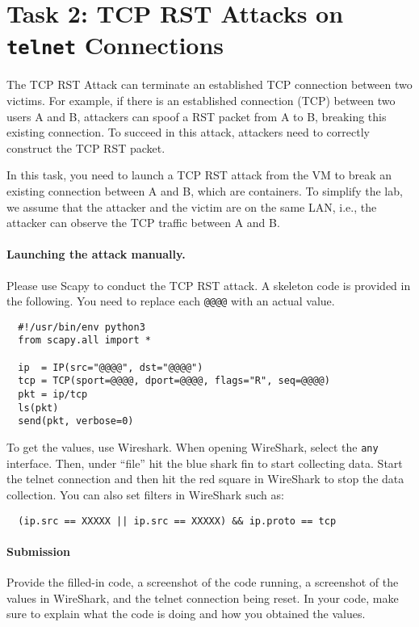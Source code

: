 \section {Task 2: TCP RST Attacks on \texttt{telnet} Connections}

The TCP RST Attack can terminate an established TCP connection between
two victims. For example, if there is an established \telnet connection (TCP)
between two users A and B, attackers can spoof a RST packet from A to B,
breaking this existing connection. To succeed in this attack, attackers
need to correctly construct the TCP RST packet. 

In this task, you need to launch a TCP RST attack from the VM 
to break an existing \telnet connection between A and B, which are 
containers.  To simplify the lab,
we assume that the attacker and the victim are on the same LAN,
i.e., the attacker can observe the TCP traffic between
A and B.


\paragraph{Launching the attack manually.} 
Please use Scapy to conduct the TCP RST attack. 
A skeleton code is provided in the following. You need to replace each
\texttt{@@@@} with an actual value.

\begin{lstlisting}
  #!/usr/bin/env python3
  from scapy.all import *
  
  ip  = IP(src="@@@@", dst="@@@@")
  tcp = TCP(sport=@@@@, dport=@@@@, flags="R", seq=@@@@)
  pkt = ip/tcp
  ls(pkt)
  send(pkt, verbose=0)
\end{lstlisting}

To get the values, use Wireshark. 
When opening WireShark, select the \texttt{any} interface. 
Then, under ``file'' hit the blue shark fin to start collecting data. 
Start the telnet connection and then hit the red square in WireShark to stop the data collection.
You can also set filters in WireShark such as:

\begin{lstlisting}
  (ip.src == XXXXX || ip.src == XXXXX) && ip.proto == tcp
\end{lstlisting}

\paragraph{Submission} Provide the filled-in code, a screenshot of the code running, a screenshot of the values in WireShark, and the telnet connection being reset.
In your code, make sure to explain what the code is doing and how you obtained the values.

